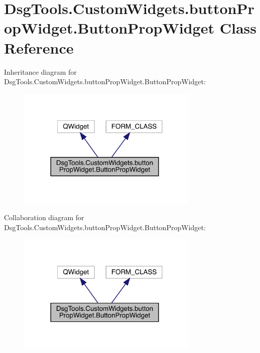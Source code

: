 \hypertarget{class_dsg_tools_1_1_custom_widgets_1_1button_prop_widget_1_1_button_prop_widget}{}\section{Dsg\+Tools.\+Custom\+Widgets.\+button\+Prop\+Widget.\+Button\+Prop\+Widget Class Reference}
\label{class_dsg_tools_1_1_custom_widgets_1_1button_prop_widget_1_1_button_prop_widget}


Inheritance diagram for Dsg\+Tools.\+Custom\+Widgets.\+button\+Prop\+Widget.\+Button\+Prop\+Widget\+:
\nopagebreak
\begin{figure}[H]
\begin{center}
\leavevmode
\includegraphics[width=246pt]{class_dsg_tools_1_1_custom_widgets_1_1button_prop_widget_1_1_button_prop_widget__inherit__graph}
\end{center}
\end{figure}


Collaboration diagram for Dsg\+Tools.\+Custom\+Widgets.\+button\+Prop\+Widget.\+Button\+Prop\+Widget\+:
\nopagebreak
\begin{figure}[H]
\begin{center}
\leavevmode
\includegraphics[width=246pt]{class_dsg_tools_1_1_custom_widgets_1_1button_prop_widget_1_1_button_prop_widget__coll__graph}
\end{center}
\end{figure}
